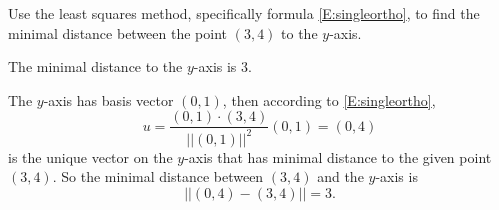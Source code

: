 \documentclass{ximera}
\begin{document}
\begin{exercise} \label{YZ_9.1.2}
Use the least squares method, specifically formula \eqref{E:singleortho}, to 
find the minimal distance between the point $(3,4)$ to the $y$-axis.

\begin{solution}
\ans
The minimal distance to the $y$-axis is $3$.

\soln 
The $y$-axis has basis vector $(0,1)$, then according to \eqref{E:singleortho},  
\[
u = \frac{(0,1)\cdot (3,4)}{||(0,1)||^2}(0,1) = (0,4)
\]
is the unique vector on the $y$-axis that has minimal distance to the given point $(3,4)$. So the minimal distance between $(3,4)$ and the $y$-axis is 
\[
||(0,4)-(3,4)|| = 3.
\]
\end{solution}
\end{exercise}
\end{document}

